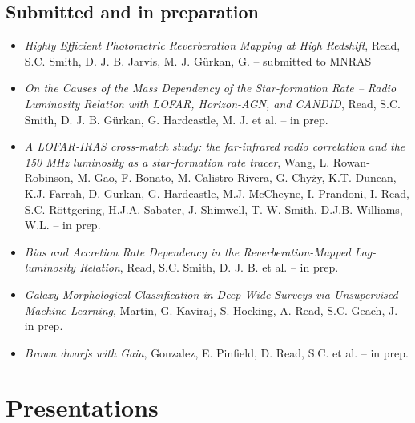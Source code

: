 \documentclass[letterpaper]{twentysecondcv} %
\begin{document}
\subsection{Submitted and in preparation}
\begin{itemize}
     \item \textit{Highly Efficient Photometric Reverberation Mapping at High Redshift}, Read, S.C. Smith, D. J. B. Jarvis, M. J. Gürkan, G. -- submitted to MNRAS\\
 \item \textit{On the Causes of the Mass Dependency of the Star-formation Rate -- Radio
Luminosity Relation with LOFAR, Horizon-AGN, and CANDID}, Read, S.C. Smith, D. J. B. Gürkan, G. Hardcastle, M. J. et al. -- in prep.\\
 \item \textit{A LOFAR-IRAS cross-match study: the far-infrared radio correlation and
the 150 MHz luminosity as a star-formation rate tracer}, Wang, L. Rowan-Robinson, M. Gao, F. Bonato, M. Calistro-Rivera, G.
Chyży, K.T. Duncan, K.J. Farrah, D. Gurkan, G. Hardcastle, M.J.
McCheyne, I. Prandoni, I. Read, S.C. Röttgering, H.J.A. Sabater, J.
Shimwell, T. W. Smith, D.J.B. Williams, W.L. -- in prep.\\
 \item \textit{Bias and Accretion Rate Dependency in the Reverberation-Mapped
Lag-luminosity Relation}, Read, S.C. Smith, D. J. B. et al. -- in prep.\\
 \item \textit{Galaxy Morphological Classification in Deep-Wide Surveys via
Unsupervised Machine Learning}, Martin, G. Kaviraj, S. Hocking, A. Read, S.C. Geach, J. -- in prep.\\
 \item \textit{Brown dwarfs with Gaia}, Gonzalez, E. Pinfield, D. Read, S.C. et al. -- in prep.\\
\end{itemize}

\section{Presentations}
\begin{twenty}
     \\
 \\
 \\
 \\
\end{twenty}
\end{document}
